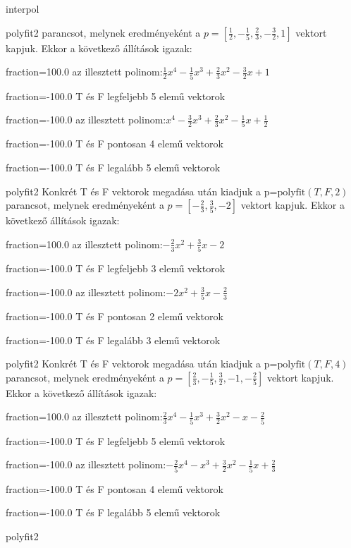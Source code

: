 \documentclass[12pt]{article}
\begin{document}
\begin{quiz}{interpol}
\begin{multi}[multiple]{polyfit2}
parancsot, melynek eredményeként a $p=\left[\frac{1}{2},-\frac{1}{5},\frac{2}{3},-\frac{3}{2},1\right]$ vektort kapjuk.
Ekkor a következő állítások igazak:
\item[fraction=100.0] az illesztett polinom:$\frac{1}{2}x^4-\frac{1}{5}x^3+\frac{2}{3}x^2-\frac{3}{2}x+1$
\item[fraction=-100.0]  T és F legfeljebb 5 elemű vektorok
\item[fraction=-100.0]  az illesztett polinom:$x^4-\frac{3}{2}x^3+\frac{2}{3}x^2-\frac{1}{5}x+\frac{1}{2}$
\item[fraction=-100.0]  T és F pontosan 4 elemű vektorok
\item[fraction=-100.0] T és F legalább 5 elemű vektorok
\end{multi}
\begin{multi}[multiple]{polyfit2}
Konkrét T és F vektorok megadása után kiadjuk a p=$\mathrm{polyfit}(T,F,2)$
parancsot, melynek eredményeként a $p=\left[-\frac{2}{3},\frac{3}{5},-2\right]$ vektort kapjuk.
Ekkor a következő állítások igazak:
\item[fraction=100.0] az illesztett polinom:$-\frac{2}{3}x^2+\frac{3}{5}x-2$
\item[fraction=-100.0]  T és F legfeljebb 3 elemű vektorok
\item[fraction=-100.0]  az illesztett polinom:$-2x^2+\frac{3}{5}x-\frac{2}{3}$
\item[fraction=-100.0]  T és F pontosan 2 elemű vektorok
\item[fraction=-100.0] T és F legalább 3 elemű vektorok
\end{multi}
\begin{multi}[multiple]{polyfit2}
Konkrét T és F vektorok megadása után kiadjuk a p=$\mathrm{polyfit}(T,F,4)$
parancsot, melynek eredményeként a $p=\left[\frac{2}{3},-\frac{1}{5},\frac{3}{2},-1,-\frac{2}{5}\right]$ vektort kapjuk.
Ekkor a következő állítások igazak:
\item[fraction=100.0] az illesztett polinom:$\frac{2}{3}x^4-\frac{1}{5}x^3+\frac{3}{2}x^2-x-\frac{2}{5}$
\item[fraction=-100.0]  T és F legfeljebb 5 elemű vektorok
\item[fraction=-100.0]  az illesztett polinom:$-\frac{2}{5}x^4-x^3+\frac{3}{2}x^2-\frac{1}{5}x+\frac{2}{3}$
\item[fraction=-100.0]  T és F pontosan 4 elemű vektorok
\item[fraction=-100.0] T és F legalább 5 elemű vektorok
\end{multi}
\begin{multi}[multiple]{polyfit2}

\end{multi}
\end{quiz}
\end{document}
